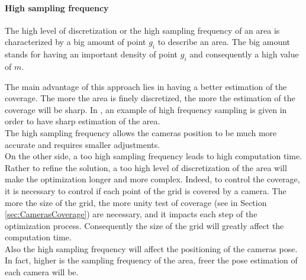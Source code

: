 \paragraph*{High sampling frequency}
The high level of discretization or the high sampling frequency of an area is characterized by a big amount of point $g_i$ to describe an area. The big amount stands for having an important density of point $g_i$ and consequently a high value of $m$. 

%
The main advantage of this approach lies in having a better estimation of the coverage. The more the area is finely discretized, the more the estimation of the coverage will be sharp. In \citep{171*horster2006}, an example of high frequency sampling is given in order to have sharp estimation of the area. \\
The high sampling frequency allows the cameras position to be much more accurate and requires smaller adjustments.
\\On the other side, a too high sampling frequency leads to high computation time. Rather to refine the solution, a too high level of discretization of the area will make the optimization longer and more complex. Indeed, to control the coverage, it is necessary to control if each point of the grid is covered by a camera.  
 The more the size of the grid, the more unity test of coverage (see in Section \ref{sec:CamerasCoverage}) are necessary, and it impacts each step of the optimization process. Consequently the size of the grid will greatly affect the computation time.  \\
Also the high sampling frequency will affect the positioning of the cameras pose. In fact, higher is the sampling frequency of the area, freer the pose estimation of  each camera will be.


